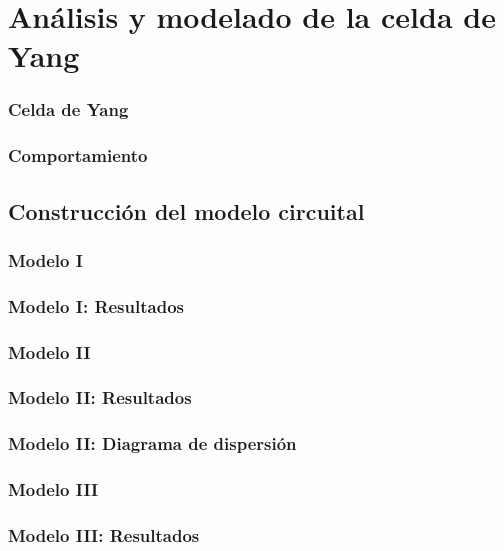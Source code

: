 \documentclass{beamer}
\begin{document}
\section{Análisis y modelado de la celda de Yang}
		
		\begin{frame} %
		\frametitle{Celda de Yang}
		\end{frame}
	
		\begin{frame} %
		\frametitle{Comportamiento}
		\end{frame}
	
	\subsection{Construcción del modelo circuital}
		\begin{frame} %
		\frametitle{Modelo I}
		\end{frame}
	
		\begin{frame} %
		\frametitle{Modelo I: Resultados}
		\end{frame}
	
		\begin{frame} %
		\frametitle{Modelo II}
		\end{frame}

		\begin{frame} %
		\frametitle{Modelo II: Resultados}
		\end{frame}
		
		\begin{frame} %
		\frametitle{Modelo II: Diagrama de dispersión}
		\end{frame}
	
		\begin{frame} %
		\frametitle{Modelo III}
		\end{frame}
	
		\begin{frame} %
		\frametitle{Modelo III: Resultados}
		\end{frame}
	
\end{document}
